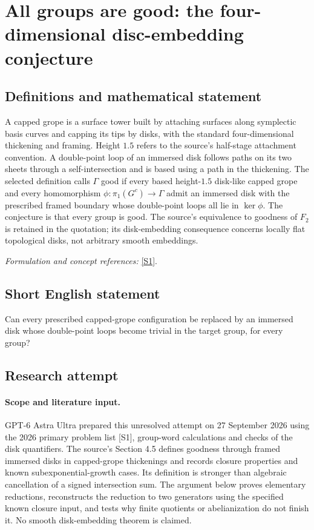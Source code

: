 \documentclass[11pt]{article}
\begin{document}
\section*{\texorpdfstring{All groups are good: the four-dimensional disc-embedding conjecture}{All groups are good: the four-dimensional disc-embedding conjecture}}\label{256}
\subsection{Definitions and mathematical statement}
A capped grope is a surface tower built by attaching surfaces along symplectic basis curves and capping its tips by disks, with the standard four-dimensional thickening and framing. Height $1.5$ refers to the source's half-stage attachment convention. A double-point loop of an immersed disk follows paths on its two sheets through a self-intersection and is based using a path in the thickening. The selected definition calls $\Gamma$ good if every based height-$1.5$ disk-like capped grope and every homomorphism
$\phi:\pi_1(G^c)\to\Gamma$ admit an immersed disk with the prescribed framed boundary whose double-point loops all lie in $\ker\phi$. The conjecture is that every group is good. The source's equivalence to goodness of $F_2$ is retained in the quotation; its disk-embedding consequence concerns locally flat topological disks, not arbitrary smooth embeddings.
\par\smallskip\textit{Formulation and concept references:} \href{https://bpb-us-e2.wpmucdn.com/websites.umass.edu/dist/b/22144/files/2026/04/K3-problem-list-watermarked.pdf}{[S1]}.

\subsection{Short English statement}
Can every prescribed capped-grope configuration be replaced by an immersed disk whose double-point loops become trivial in the target group, for every group?
\subsection{Research attempt}
\paragraph{Scope and literature input.}
GPT-6 Astra Ultra prepared this unresolved attempt on 27 September 2026
using the 2026 primary problem list [S1], group-word calculations and
checks of the disk quantifiers. The source's Section 4.5 defines goodness
through framed immersed disks in capped-grope thickenings and records
closure properties and known subexponential-growth cases. Its definition
is stronger than algebraic cancellation of a signed intersection sum.
The argument below proves elementary reductions, reconstructs the
reduction to two generators using the specified known closure input,
and tests why finite quotients or abelianization do not finish it.
No smooth disk-embedding theorem is claimed.
\end{document}
